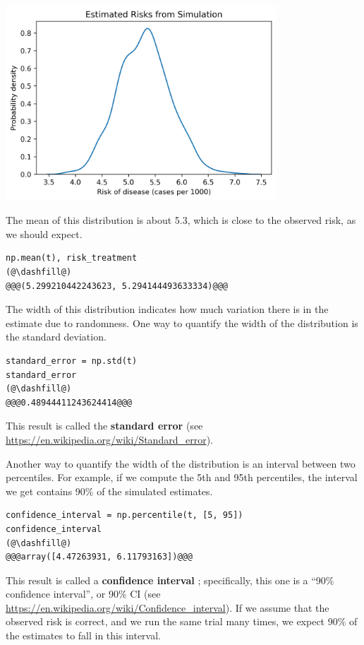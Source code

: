 \begin{center}
\includegraphics[width=4in]{chapters/11_resampling_files/11_resampling_29_0.png}
\end{center}

The mean of this distribution is about 5.3, which is close to the
observed risk, as we should expect.

\begin{lstlisting}[]
np.mean(t), risk_treatment
(@\dashfill@)
@@@(5.299210442243623, 5.294144493633334)@@@
\end{lstlisting}

The width of this distribution indicates how much variation there is in
the estimate due to randomness. One way to quantify the width of the
distribution is the standard deviation.

\begin{lstlisting}[]
standard_error = np.std(t)
standard_error
(@\dashfill@)
@@@0.48944411243624414@@@
\end{lstlisting}

This result is called the \textbf{standard error} (see
\url{https://en.wikipedia.org/wiki/Standard_error}).

Another way to quantify the width of the distribution is an interval
between two percentiles. For example, if we compute the 5th and 95th
percentiles, the interval we get contains 90\% of the simulated
estimates.

\begin{lstlisting}[]
confidence_interval = np.percentile(t, [5, 95])
confidence_interval
(@\dashfill@)
@@@array([4.47263931, 6.11793163])@@@
\end{lstlisting}

This result is called a \textbf{confidence interval} ; specifically,
this one is a ``90\% confidence interval'', or 90\% CI (see
\url{https://en.wikipedia.org/wiki/Confidence_interval}). If we assume
that the observed risk is correct, and we run the same trial many times,
we expect 90\% of the estimates to fall in this interval.


